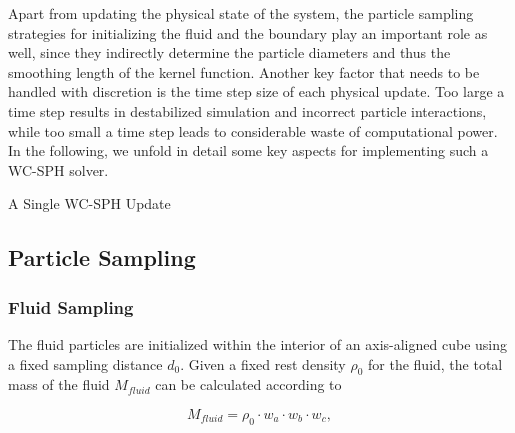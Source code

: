 \documentclass[
	11pt, 
	DIV10,
	ngerman,
	a4paper, 
	oneside, 
	headings=normal, 
	captions=tableheading,
	final, 
	numbers=noenddot
]{scrartcl}
\begin{document}
Apart from updating the physical state of the system, the particle sampling strategies for initializing the fluid and the boundary play an important role as well, since they indirectly determine the particle diameters and thus the smoothing length of the kernel function. Another key factor that needs to be handled with discretion is the time step size of each physical update. Too large a time step results in destabilized simulation and incorrect particle interactions, while too small a time step leads to considerable waste of computational power. In the following, we unfold in detail some key aspects for implementing such a WC-SPH solver.

\large
\begin{algorithm}
	\DontPrintSemicolon
	\SetAlgoLined
	\caption{\label{alg1} A Single WC-SPH Update}
\end{algorithm}
\normalsize

\subsection{Particle Sampling}
\subsubsection{Fluid Sampling}

The fluid particles are initialized within the interior of an axis-aligned cube using a fixed sampling distance $ d_{0} $. Given a fixed rest density $ \rho_{0} $ for the fluid, the total mass of the fluid $ M_{fluid} $ can be calculated according to

\begin{equation}
	\label{eq1}
	M_{fluid} = \rho_{0} \cdot w_{a} \cdot w_{b} \cdot w_{c},
\end{equation}
\end{document}
